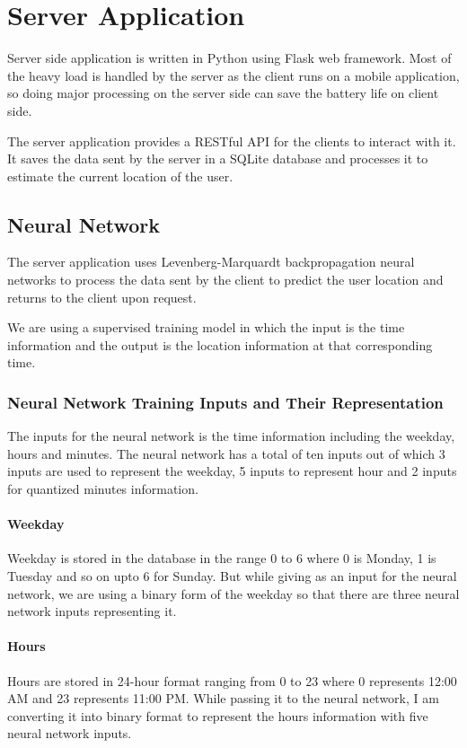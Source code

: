 \documentclass[conference]{IEEEtran}
\begin{document}

\section{Server Application}
Server side application is written in Python using Flask web framework. Most of the heavy load is handled by the server as the client runs on a mobile application, so doing major processing on the server side can save the battery life on client side.

The server application provides a RESTful API for the clients to interact with it. It saves the data sent by the server in  a SQLite database and processes it to estimate the current location of the user.

\subsection{Neural Network}
The server application uses Levenberg-Marquardt backpropagation neural networks to process the data sent by the client to predict the user location and returns to the client upon request.

We are using a supervised training model in which the input is the time information and the output is the location information at that corresponding time.

\subsubsection{Neural Network Training Inputs and Their Representation}
The inputs for the neural network is the time information including the weekday, hours and minutes.
The neural network has a total of ten inputs out of which 3 inputs are used to represent the weekday, 5 inputs to represent hour and 2 inputs for quantized minutes information.
\paragraph{Weekday}
Weekday is stored in the database in the range 0 to 6 where 0 is Monday, 1 is Tuesday and so on upto 6 for Sunday.
But while giving as an input for the neural network, we are using a binary form of the weekday so that there are three neural network inputs representing it.
\paragraph{Hours}
Hours are stored in 24-hour format ranging from 0 to 23 where 0 represents 12:00 AM and 23 represents 11:00 PM.
While passing it to the neural network, I am converting it into binary format to represent the hours information with five neural network inputs.
\end{document}

